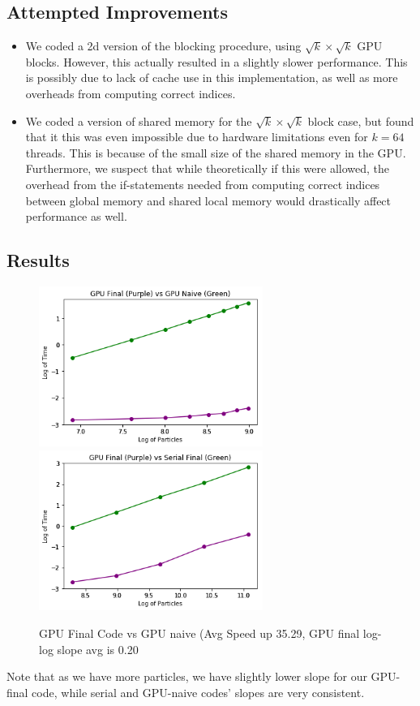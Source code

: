 \documentclass[12pt]{article}
\begin{document}
\subsection{Attempted Improvements}
\begin{itemize}
\item We coded a 2d version of the blocking procedure, using $\sqrt{k} \times \sqrt{k}$ GPU blocks. However, this actually resulted in a slightly slower performance. This is possibly due to lack of cache use in this implementation, as well as more overheads from computing correct indices. 
\item We coded a version of shared memory for the $\sqrt{k} \times \sqrt{k}$ block case, but found that it this was even impossible due to hardware limitations even for $k = 64$ threads. This is because of the small size of the shared memory in the GPU. Furthermore, we suspect that while theoretically if this were allowed, the overhead from the if-statements needed from computing correct indices between global memory and shared local memory would drastically affect performance as well.  
\end{itemize}
\newpage 
\subsection{Results}
\begin{figure}[h]
  \caption{GPU Final Code vs GPU naive (Avg Speed up 35.29, GPU final log-log slope avg is 0.20}
  \centering 
  \includegraphics[width = 0.65\textwidth]{GPU_final_vs_GPU_naive.png}
  \includegraphics[width = 0.65\textwidth]{GPU_final_vs_Serial_final.png}
\end{figure}
Note that as we have more particles, we have slightly lower slope for our GPU-final code, while serial and GPU-naive codes' slopes are very consistent. 
\newpage 
\end{document}
